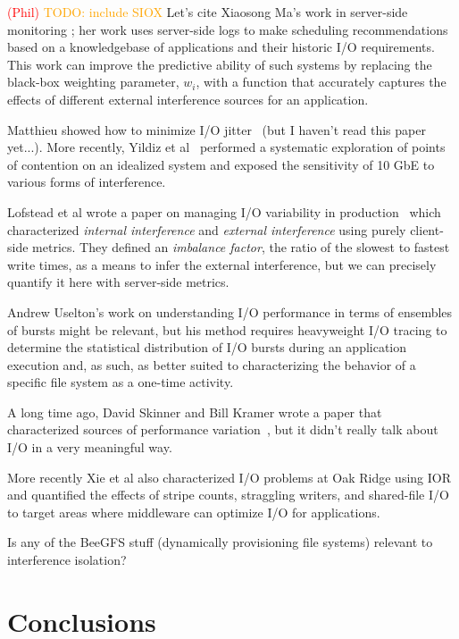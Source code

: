\documentclass[conference,10pt,compsocconf]{IEEEtran}
\newcommand{\assign}[1]{\textcolor{red}{(#1)}}
\newcommand{\todo}[1]{\textcolor{Orange}{TODO: #1}}
\begin{document}
\assign{Phil} \todo{include SIOX} Let's cite Xiaosong Ma's work in server-side
monitoring \cite{Liu2016}; her work uses server-side logs to make scheduling
recommendations based on a knowledgebase of applications and their historic
I/O requirements.  This work can improve the predictive ability of such systems
by replacing the black-box weighting parameter, $w_{i}$, with a function that
accurately captures the effects of different external interference sources for
an application.

Matthieu showed how to minimize I/O jitter~\cite{Dorier2012} (but I haven't read
this paper yet...).  More recently, Yildiz et al~\cite{Yildiz2016} performed
a systematic exploration of points of contention on an idealized system and
exposed the sensitivity of 10 GbE to various forms of interference.

Lofstead et al wrote a paper on managing I/O variability in production~
\cite{Lofstead2010} which characterized \emph{internal interference} and
\emph{external interference} using purely client-side metrics.  They defined an
\emph{imbalance factor}, the ratio of the slowest to fastest write times, as a
means to infer the external interference, but we can precisely quantify it here
with server-side metrics.

Andrew Uselton's work on understanding I/O performance in terms of ensembles of
bursts might be relevant\cite{Uselton2010}, but his method requires heavyweight
I/O tracing to determine the statistical distribution of I/O bursts during an
application execution and, as such, as better suited to characterizing the
behavior of a specific file system as a one-time activity.

A long time ago, David Skinner and Bill Kramer wrote a paper that characterized
sources of performance variation~\cite{Skinner2005}, but it didn't really talk
about I/O in a very meaningful way.

More recently Xie et al also characterized I/O problems at Oak
Ridge\cite{Xie2012} using IOR and quantified the effects of stripe counts,
straggling writers, and shared-file I/O to target areas where middleware can
optimize I/O for applications.

Is any of the BeeGFS stuff (dynamically provisioning file systems) relevant to
interference isolation?

\section{Conclusions} \label{sec:conclusions}
\end{document}
